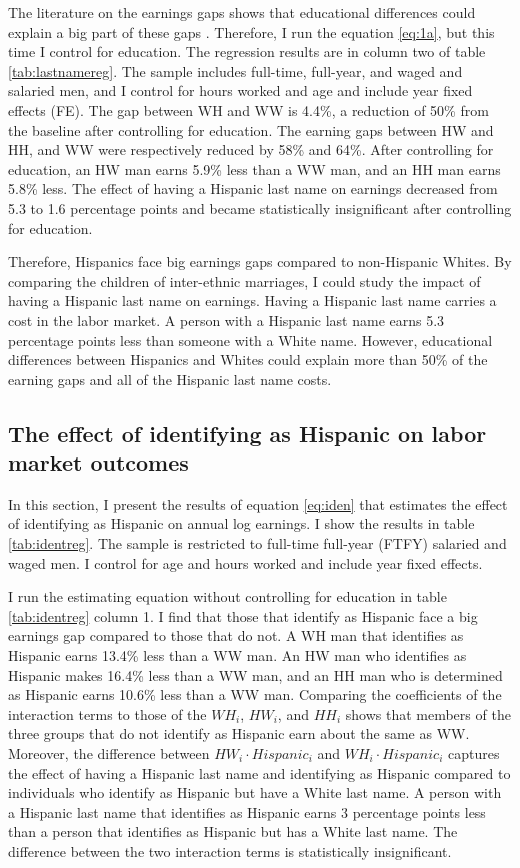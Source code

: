 \documentclass{wptemp}
\begin{document}
The literature on the earnings gaps shows that educational differences could explain a big part of these gaps \citep{duncan2006hispanics, duncan2017complexity, duncan2018identifying, duncan2020new}. Therefore, I run the equation \ref{eq:1a}, but this time I control for education. The regression results are in column two of table \ref{tab:lastnamereg}. The sample includes full-time, full-year, and waged and salaried men, and I control for hours worked and age and include year fixed effects (FE). The gap between WH and WW is 4.4\%, a reduction of 50\% from the baseline after controlling for education. The earning gaps between HW and HH, and WW were respectively reduced by 58\% and 64\%. After controlling for education, an HW man earns 5.9\% less than a WW man, and an HH man earns 5.8\% less. The effect of having a Hispanic last name on earnings decreased from 5.3 to 1.6 percentage points and became statistically insignificant after controlling for education.

Therefore, Hispanics face big earnings gaps compared to non-Hispanic Whites. By comparing the children of inter-ethnic marriages, I could study the impact of having a Hispanic last name on earnings. Having a Hispanic last name carries a cost in the labor market. A person with a Hispanic last name earns 5.3 percentage points less than someone with a White name. However, educational differences between Hispanics and Whites could explain more than 50\% of the earning gaps and all of the Hispanic last name costs.

\subsection{The effect of identifying as Hispanic on labor market outcomes}

In this section, I present the results of equation \ref{eq:iden} that estimates the effect of identifying as Hispanic on annual log earnings. I show the results in table \ref{tab:identreg}. The sample is restricted to full-time full-year (FTFY) salaried and waged men. I control for age and hours worked and include year fixed effects.

I run the estimating equation without controlling for education in table \ref{tab:identreg} column 1. I find that those that identify as Hispanic face a big earnings gap compared to those that do not. A WH man that identifies as Hispanic earns 13.4\% less than a WW man. An HW man who identifies as Hispanic makes 16.4\% less than a WW man, and an HH man who is determined as Hispanic earns 10.6\% less than a WW man. Comparing the coefficients of the interaction terms to those of the $WH_{i}$, $HW_{i}$, and $HH_{i}$ shows that members of the three groups that do not identify as Hispanic earn about the same as WW.
Moreover, the difference between $HW_{i} \cdot Hispanic_{i}$  and $WH_{i} \cdot Hispanic_{i}$ captures the effect of having a Hispanic last name and identifying as Hispanic compared to individuals who identify as Hispanic but have a White last name. A person with a Hispanic last name that identifies as Hispanic earns 3 percentage points less than a person that identifies as Hispanic but has a White last name. The difference between the two interaction terms is statistically insignificant.
\end{document}
